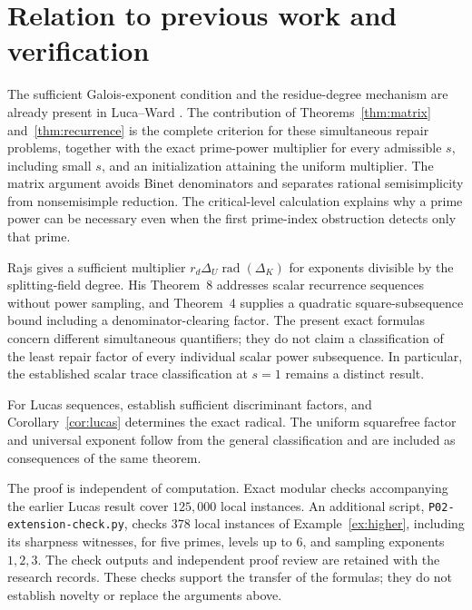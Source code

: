 \documentclass[11pt]{article}
\theoremstyle{remark}
\newcommand{\rad}{\operatorname{rad}}
\begin{document}
\section{Relation to previous work and verification}
The sufficient Galois-exponent condition and the residue-degree mechanism are already present in Luca--Ward \cite{LW}. The contribution of Theorems~\ref{thm:matrix} and~\ref{thm:recurrence} is the complete criterion for these simultaneous repair problems, together with the exact prime-power multiplier for every admissible $s$, including small $s$, and an initialization attaining the uniform multiplier. The matrix argument avoids Binet denominators and separates rational semisimplicity from nonsemisimple reduction. The critical-level calculation explains why a prime power can be necessary even when the first prime-index obstruction detects only that prime.

Rajs \cite[Theorem~9]{Rajs} gives a sufficient multiplier $r_d\Delta_U\rad(\Delta_K)$ for exponents divisible by the splitting-field degree. His Theorem~8 addresses scalar recurrence sequences without power sampling, and Theorem~4 supplies a quadratic square-subsequence bound including a denominator-clearing factor. The present exact formulas concern different simultaneous quantifiers; they do not claim a classification of the least repair factor of every individual scalar power subsequence. In particular, the established scalar trace classification at $s=1$ remains a distinct result.

For Lucas sequences, \cite{MW,LW} establish sufficient discriminant factors, and Corollary~\ref{cor:lucas} determines the exact radical. The uniform squarefree factor and universal exponent follow from the general classification and are included as consequences of the same theorem.

The proof is independent of computation. Exact modular checks accompanying the earlier Lucas result cover $125{,}000$ local instances. An additional script, \texttt{P02-extension-check.py}, checks $378$ local instances of Example~\ref{ex:higher}, including its sharpness witnesses, for five primes, levels up to $6$, and sampling exponents $1,2,3$. The check outputs and independent proof review are retained with the research records. These checks support the transfer of the formulas; they do not establish novelty or replace the arguments above.
\end{document}
